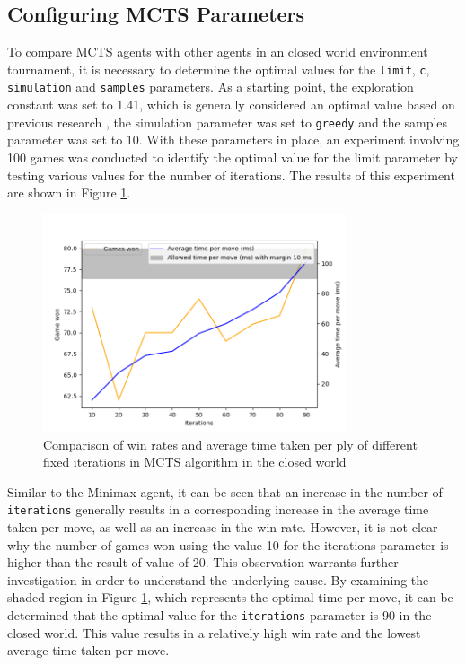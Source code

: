 \subsection{Configuring MCTS Parameters}

To compare MCTS agents with other agents in an closed world environment tournament, it is necessary to determine the optimal values for the \texttt{limit}, \texttt{c}, \texttt{simulation} and \texttt{samples} parameters. As a starting point, the exploration constant was set to 1.41, which is generally considered an optimal value based on previous research \citep{AI4Ed}, the simulation parameter was set to \texttt{greedy} and the samples parameter was set to 10. With these parameters in place, an experiment involving 100 games was conducted to identify the optimal value for the limit parameter by testing various values for the number of iterations. The results of this experiment are shown in Figure \ref{mctsCWIterations}.

\begin{figure}[h]
  \centering
  \captionsetup{justification=centering}
  \includegraphics[width=0.8\textwidth]{../img/mcts_iterations_closedworld.png}
  \caption{Comparison of win rates and average time taken per ply of different fixed iterations in MCTS algorithm in the closed world}
  \label{mctsCWIterations}
\end{figure}

Similar to the Minimax agent, it can be seen that an increase in the number of \texttt{iterations} generally results in a corresponding increase in the average time taken per move, as well as an increase in the win rate. However, it is not clear why the number of games won using the value 10 for the iterations parameter is higher than the result of value of 20. This observation warrants further investigation in order to understand the underlying cause. By examining the shaded region in Figure \ref{mctsCWIterations}, which represents the optimal time per move, it can be determined that the optimal value for the \texttt{iterations} parameter is 90 in the closed world. This value results in a relatively high win rate and the lowest average time taken per move.

